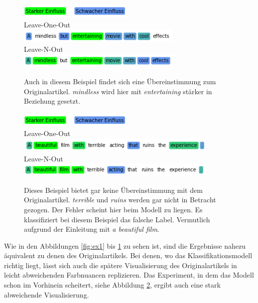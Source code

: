 \documentclass[DIV=13,fontsize=11pt]{scrartcl}
\begin{document}
\begin{figure}[H]
    \centering
    \includegraphics[]{img/legend.png}\\
    Leave-One-Out\\
    \includegraphics[]{img/third_ex_loo.png}\\
    Leave-N-Out\\
    \includegraphics[]{img/third_ex_lno.png}
    \caption{Auch in diesem Beispiel findet sich eine Übereinstimmung zum Originalartikel. \textit{mindless} wird hier mit \textit{entertaining} stärker in Beziehung gesetzt.}
    \label{fig:ex3}
\end{figure}

\begin{figure}[H]
    \centering
    \includegraphics[]{img/legend.png}\\
    Leave-One-Out\\
    \includegraphics[]{img/fourth_ex_loo.png}\\
    Leave-N-Out\\
    \includegraphics[]{img/fourth_ex_lno.png}
    \caption{Dieses Beispiel bietet gar keine Übereinstimmung mit dem Originalartikel. \textit{terrible} und \textit{ruins} werden gar nicht in Betracht gezogen. Der Fehler scheint hier beim Modell zu liegen. Es klassifiziert bei diesem Beispiel das falsche Label. Vermutlich aufgrund der Einleitung mit \textit{a beautiful film}.}
    \label{fig:ex4}
\end{figure}

Wie in den Abbildungen \ref{fig:ex1} bis \ref{fig:ex3} zu sehen ist, sind die Ergebnisse nahezu äquivalent zu denen des
Originalartikels. Bei denen, wo das Klassifikationsmodell richtig liegt, lässt sich auch die
spätere Visualisierung des Originalartikels in leicht abweichenden Farbnuancen replizieren.
Das Experiment, in dem das Modell schon im Vorhinein scheitert, siehe Abbildung \ref{fig:ex4}, ergibt auch eine stark abweichende Visualisierung.
\end{document}
